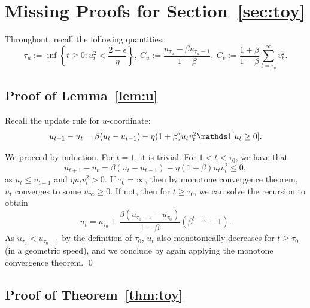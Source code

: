 \section{Missing Proofs for Section~\ref{sec:toy}}
\label{app:proofs}

Throughout, recall the following quantities:
\begin{equation}
    \tau_u := \inf\left\{ t \geq 0 : u_t^2 < \frac{2 - \epsilon}{\eta} \right\}, \
    C_u := \frac{u_{\tau_u} - \beta u_{\tau_u - 1}}{1 - \beta}, \
    C_v := \frac{1 + \beta}{1 - \beta} \sum_{t = \tau_u}^\infty v_t^2.
\end{equation}

\subsection{Proof of Lemma~\ref{lem:u}}
\label{app:lemma-u}
Recall the update rule for $u$-coordinate:
\begin{equation}
    u_{t+1} - u_t = \beta (u_t - u_{t-1}) - \eta(1 + \beta) u_t v_t^2 \indicator[u_t \geq 0].
\end{equation}

We proceed by induction.
For $t = 1$, it is trivial.
For $1 < t < \tau_0$, we have that
\begin{equation*}
    u_{t+1} - u_t = \beta (u_t - u_{t-1}) - \eta(1 + \beta) u_t v_t^2
    \leq 0,
\end{equation*}
as $u_t \leq u_{t-1}$ and $\eta u_t v_t^2 > 0$.
If $\tau_0 = \infty$, then by monotone convergence theorem, $u_t$ converges to some $u_\infty \geq 0$.
If not, then for $t \geq \tau_0$, we can solve the recursion to obtain
\begin{equation*}
    u_t = u_{\tau_0} + \frac{\beta (u_{\tau_0 - 1} - u_{\tau_0})}{1 - \beta} (\beta^{t - \tau_0} - 1).
\end{equation*}
As $u_{\tau_0} < u_{\tau_0-1}$ by the definition of $\tau_0$, $u_t$ also monotonically decreases for $t \geq \tau_0$ (in a geometric speed), and we conclude by again applying the monotone convergence theorem.
\qed






\subsection{Proof of Theorem~\ref{thm:toy}}
\label{app:pf-toy}


